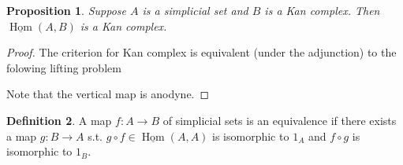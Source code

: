 \documentclass{article}
\theoremstyle{definition}
\newtheorem{defn}{Definition}[section]
\theoremstyle{remark}
\theoremstyle{plain}
\newtheorem{prop}[defn]{Proposition}
\newcommand{\Hom}{\operatorname{Hom}}
\begin{document}
\begin{prop}
    Suppose $A$ is a simplicial set and $B$ is a Kan complex. Then $\underline{\Hom}(A,B)$ is a Kan complex.
\end{prop}
\begin{proof}
    The criterion for Kan complex is equivalent (under the adjunction) to the folowing lifting problem
    \begin{center}
    \end{center}
    Note that the vertical map is anodyne.
\end{proof}

\begin{defn}
    A map $f:A\to B$ of simplicial sets is an equivalence if there exists a map $g:B\to A$ s.t. $g\circ f\in\underline{\Hom}(A,A)$ is isomorphic to $1_A$ and $f\circ g$ is isomorphic to $1_B$.
\end{defn}
\end{document}
